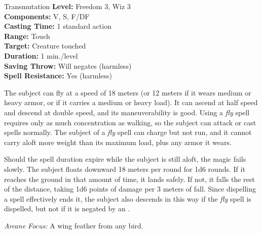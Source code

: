 {Transmutation}
{
	\textbf{Level:}
	Freedom 3, Wiz 3\\
	\textbf{Components:}
	V, S, F/DF\\
	\textbf{Casting Time:}
	1 standard action\\
	\textbf{Range:}
	Touch\\
	\textbf{Target:}
	Creature touched\\
	\textbf{Duration:}
	1 min./level\\
	\textbf{Saving Throw:}
	Will negates (harmless)\\
	\textbf{Spell Resistance:}
	Yes (harmless)\\
}
{
	The subject can fly at a speed of 18 meters (or 12 meters if it wears medium or heavy armor, or if it carries a medium or heavy load). It can ascend at half speed and descend at double speed, and its maneuverability is good. Using a \emph{fly} spell requires only as much concentration as walking, so the subject can attack or cast spells normally. The subject of a \emph{fly} spell can charge but not run, and it cannot carry aloft more weight than its maximum load, plus any armor it wears.

	Should the spell duration expire while the subject is still aloft, the magic fails slowly. The subject floats downward 18 meters per round for 1d6 rounds. If it reaches the ground in that amount of time, it lands safely. If not, it falls the rest of the distance, taking 1d6 points of damage per 3 meters of fall. Since dispelling a spell effectively ends it, the subject also descends in this way if the \emph{fly} spell is dispelled, but not if it is negated by an .

	\textit{Arcane Focus:}
	A wing feather from any bird.

}
